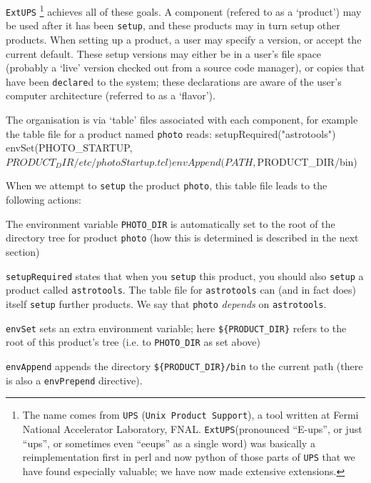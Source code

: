 \documentclass{article}
\newcommand{\code}[1]{\texttt{#1}}
\newcommand{\eups}{\code{ExtUPS}\xspace}
\let\overbatim=\verbatim
\let\oendverbatim=\endverbatim
\renewenvironment{verbatim}
{\center\minipage{16cm}\overbatim}
{\oendverbatim\endminipage\endcenter}
\begin{document}
\eups
\footnote{%
  The name comes from \code{UPS} (\code{Unix Product Support}), a
  tool written at Fermi National Accelerator Laboratory, FNAL. \eups (pronounced ``E-ups'',
  or just ``ups'', or sometimes even ``eeups'' as a single word)
  was basically a reimplementation first in perl and now python of those parts of \code{UPS}
  that we have found especially valuable;  we have now made extensive extensions.}
achieves all of these goals. A component (refered to as a `product')
may be used after it has been \code{setup}, and these products may
in turn setup other products. When setting up a product, a user
may specify a version, or accept the current default. These setup versions
may either be in a user's file space (probably a `live' version checked out from a source code manager),
or copies that have been \code{declare}d to the system; these declarations are
aware of the user's computer architecture (referred to as a `flavor').

The organisation is via `table' files
associated with each component, for example the table file
for a product named \code{photo} reads:
\begin{verbatim}
       setupRequired("astrotools")
       envSet(PHOTO_STARTUP, ${PRODUCT_DIR}/etc/photoStartup.tcl)
       envAppend(PATH, ${PRODUCT_DIR}/bin)
\end{verbatim}

When we attempt to \code{setup} the product \code{photo}, this
table file leads to the following actions:
\begin{description}
\item
  The environment variable \code{PHOTO\_DIR} is automatically set to
  the root of the directory tree for product \code{photo} (how this
  is determined is described in the next section)
\item
  \code{setupRequired} states that when you \code{setup} this product, you
  should also \code{setup} a product called \code{astrotools}.
  The table file for \code{astrotools} can
  (and in fact does) itself \code{setup} further products.  We say that
  \code{photo} \emph{depends} on \code{astrotools}.
\item
  \code{envSet} sets an extra environment variable; here \code{\$\{PRODUCT\_DIR\}}
  refers to the root of this product's tree (i.e. to \code{PHOTO\_DIR} as set above)
\item
  \code{envAppend} appends
  the directory \code{\$\{PRODUCT\_DIR\}/bin} to the current path (there
  is also a \code{envPrepend} directive).
\end{description}
\end{document}
